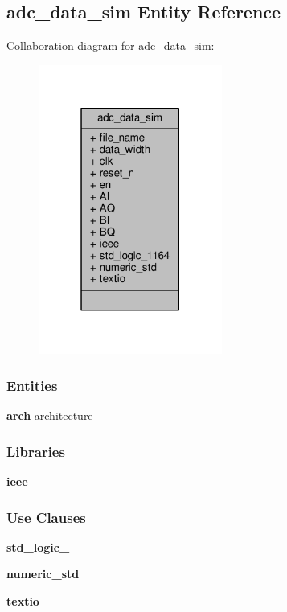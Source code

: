 \subsection{adc\+\_\+data\+\_\+sim Entity Reference}
\label{classadc__data__sim}


Collaboration diagram for adc\+\_\+data\+\_\+sim\+:\nopagebreak
\begin{figure}[H]
\begin{center}
\leavevmode
\includegraphics[width=171pt]{d2/d0f/classadc__data__sim__coll__graph}
\end{center}
\end{figure}
\subsubsection*{Entities}
\begin{DoxyCompactItemize}
\item 
{\bf arch} architecture
\end{DoxyCompactItemize}
\subsubsection*{Libraries}
 \begin{DoxyCompactItemize}
\item 
{\bf ieee} 
\end{DoxyCompactItemize}
\subsubsection*{Use Clauses}
 \begin{DoxyCompactItemize}
\item 
{\bf std\+\_\+logic\+\_}   
\item 
{\bf numeric\+\_\+std}   
\item 
{\bf textio}   
\end{DoxyCompactItemize}
